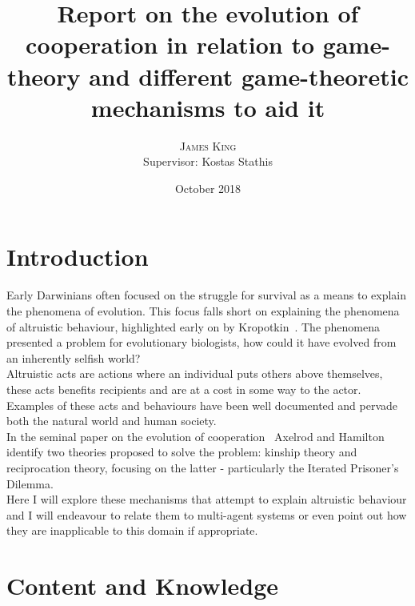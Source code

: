 \documentclass[twoside,twocolumn]{article}
\title{Report on the evolution of cooperation in relation to game-theory and different game-theoretic mechanisms to aid it} %
\author{%
\textsc{James King} \\%
\normalsize Supervisor: Kostas Stathis \\ %
}
\date{October 2018} %
\begin{document}


\maketitle


\section{Introduction}
Early Darwinians often focused on the struggle for survival as a means to explain the phenomena of evolution. This focus falls short on explaining the phenomena of altruistic behaviour, highlighted early on by Kropotkin~\cite{arithmetics_of_mutual_help}. The phenomena presented a problem for evolutionary biologists, how could it have evolved from an inherently selfish world?\\
Altruistic acts are actions where an individual puts others above themselves, these acts benefits recipients and are at a cost in some way to the actor. Examples of these acts and behaviours have been well documented and pervade both the natural world and human society.\\
In the seminal paper on the evolution of cooperation~\cite{evolution_of_cooperation} Axelrod and Hamilton identify two theories proposed to solve the problem: kinship theory and reciprocation theory, focusing on the latter - particularly the Iterated Prisoner's Dilemma.\\ 
Here I will explore these mechanisms that attempt to explain altruistic behaviour and I will endeavour to relate them to multi-agent systems or even point out how they are inapplicable to this domain if appropriate.


\section{Content and Knowledge}
\end{document}
